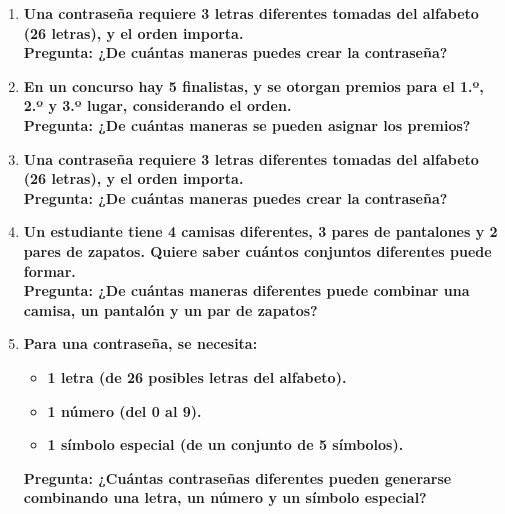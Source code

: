 \documentclass[12pt]{article}
\begin{document}
\begin{enumerate}[label=\textbf{\arabic*.}]
        \item \textbf{Una contraseña requiere 3 letras diferentes tomadas del alfabeto (26 letras), y
        el orden importa.\\
        Pregunta: ¿De cuántas maneras puedes crear la contraseña?}
        
        \item \textbf{En un concurso hay 5 finalistas, y se otorgan premios para el 1.º, 2.º y 3.º lugar,
        considerando el orden.\\
        Pregunta: ¿De cuántas maneras se pueden asignar los premios?}

        \item \textbf{Una contraseña requiere 3 letras diferentes tomadas del alfabeto (26 letras), y el
        orden importa.\\
        Pregunta: ¿De cuántas maneras puedes crear la contraseña?}
        
        \item \textbf{Un estudiante tiene 4 camisas diferentes, 3 pares de pantalones y 2 pares de
        zapatos. Quiere saber cuántos conjuntos diferentes puede formar.\\
        Pregunta: ¿De cuántas maneras diferentes puede combinar una camisa, un
        pantalón y un par de zapatos?}
        
        \item \textbf{Para una contraseña, se necesita:}
            \begin{itemize}
                \item \textbf{1 letra (de 26 posibles letras del alfabeto).}
                \item \textbf{1 número (del 0 al 9).}
                \item \textbf{1 símbolo especial (de un conjunto de 5 símbolos).}
            \end{itemize}
            \textbf{Pregunta: ¿Cuántas contraseñas diferentes pueden generarse combinando una
            letra, un número y un símbolo especial?}
        

\end{enumerate}
\end{document}
